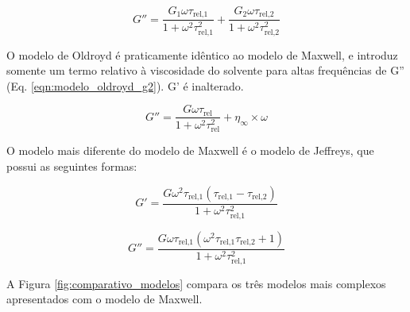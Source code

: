 			\begin{equation}
				G'' = \dfrac{  G_1 \omega  \tau_{\textrm{rel,1}}        }{ 1 + \omega^2 \tau_{\textrm{rel,1}}^2 } + \dfrac{  G_2 \omega  \tau_{\textrm{rel,2}}        }{ 1 + \omega^2 \tau_{\textrm{rel,2}}^2 }
			\label{eqn:modelo_doismodos_g2}
			\end{equation}
			
			
			O modelo de Oldroyd é praticamente idêntico ao modelo de Maxwell, e introduz somente um termo relativo à viscosidade do solvente para altas frequências de G'' (Eq. \ref{eqn:modelo_oldroyd_g2}). G' é inalterado.
			
			\begin{equation}
				G'' =\dfrac{  G \omega  \tau_{\textrm{rel}}        }{ 1 + \omega^2 \tau_{\textrm{rel}}^2 } + \eta_{\infty} \times \omega
				\label{eqn:modelo_oldroyd_g2}
			\end{equation}
			
			O modelo mais diferente do modelo de Maxwell é o modelo de Jeffreys, que possui as seguintes formas:
			
			\begin{equation}
				G' = \dfrac{G \omega^{2} \tau_{\textrm{rel,1}} \left(\tau_{\textrm{rel,1}} - \tau_{\textrm{rel,2}}\right)}{1 + \omega^{2} \tau_{\textrm{rel,1}}^{2}}
				\label{eqn:modelo_jeffreys_g1}
			\end{equation}
			
			\begin{equation}
				G'' = \dfrac{G \omega \tau_{\textrm{rel,1}} \left(\omega^{2} \tau_{\textrm{rel,1}} \tau_{\textrm{rel,2}} + 1\right)}{1 + \omega^{2} \tau_{\textrm{rel,1}}^{2}}
				\label{eqn:modelo_jeffreys_g2}
			\end{equation}
			
			
			A Figura \ref{fig:comparativo_modelos} compara os três modelos mais complexos apresentados com o modelo de Maxwell. 
			

